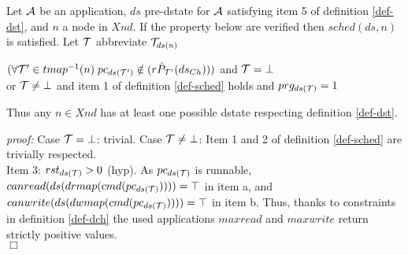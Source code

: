 \documentclass{article}
\begin{document}
\begin{fact}\label{fact-sched}Let ${\cal A}$ be an application, $ds$ pre-dstate for ${\cal A}$ satisfying item 5 of definition \ref{def-dst}, and $n$ a node in $X\!nd$.
If the property below are verified then $sched(ds,n)$ is satisfied. Let ${\cal T}$ abbreviate ${\cal T}_{ds(n)}$

\hspace*{3mm}$(\forall{\cal T'}\in tmap^{-1}(n)\;pc_{ds({\cal T'})}\notin (r\hat P_{{\cal T'}}(ds_{Ch})))$ and ${\cal T}= \bot$\\
\hspace*{3mm}or ${\cal T}\neq \bot$ and item 1 of definition \ref{def-sched} holds and $prg_{ds({\cal T})}=1$

\vspace{1mm}
Thus any $n\in X\!nd$ has at least one possible dstate respecting definition \ref{def-dst}. 
\end{fact}
{\em proof:} Case ${\cal T}= \bot$: trivial. Case ${\cal T}\neq \bot$: Item 1 and 2 of definition \ref{def-sched} are trivially respected.\\
Item 3: $rst_{ds({\cal T})}>0$ (hyp). As $pc_{ds({\cal T})}$ is runnable, $canread(ds(drmap(cmd(pc_{ds({\cal T})}))))=\top$ in item a, and $canwrite(ds(dwmap(cmd(pc_{ds({\cal T})}))))=\top$ in item b. Thus, thanks to constraints in definition \ref{def-dch} the used applications $maxread$ and $maxwrite$ return strictly positive values.\\
$\Box$

\end{document}
